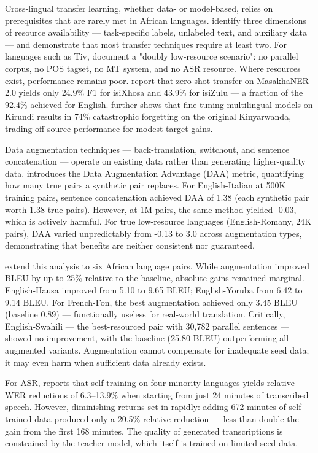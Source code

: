 \documentclass[11pt,a4paper]{article}
\begin{document}
Cross-lingual transfer learning, whether data- or model-based, relies on prerequisites that are rarely met in African languages. \citet{hedderich2021survey} identify three dimensions of resource availability — task-specific labels, unlabeled text, and auxiliary data — and demonstrate that most transfer techniques require at least two. For languages such as Tiv, \citet{achir2026preservation} document a "doubly low-resource scenario": no parallel corpus, no POS tagset, no MT system, and no ASR resource. Where resources exist, performance remains poor. \citet{garcia2025cross} report that zero-shot transfer on MasakhaNER 2.0 yields only 24.9\% F1 for isiXhosa and 43.9\% for isiZulu — a fraction of the 92.4\% achieved for English. \citet{thangaraj2024cross} further shows that fine-tuning multilingual models on Kirundi results in 74\% catastrophic forgetting on the original Kinyarwanda, trading off source performance for modest target gains.

Data augmentation techniques — back-translation, switchout, and sentence concatenation — operate on existing data rather than generating higher-quality data. \citet{lamar2023measuring} introduces the Data Augmentation Advantage (DAA) metric, quantifying how many true pairs a synthetic pair replaces. For English-Italian at 500K training pairs, sentence concatenation achieved DAA of 1.38 (each synthetic pair worth 1.38 true pairs). However, at 1M pairs, the same method yielded -0.03, which is actively harmful. For true low-resource languages (English-Romany, 24K pairs), DAA varied unpredictably from -0.13 to 3.0 across augmentation types, demonstrating that benefits are neither consistent nor guaranteed.

\citet{oduwole2025scarcity} extend this analysis to six African language pairs. While augmentation improved BLEU by up to 25\% relative to the baseline, absolute gains remained marginal. English-Hausa improved from 5.10 to 9.65 BLEU; English-Yoruba from 6.42 to 9.14 BLEU. For French-Fon, the best augmentation achieved only 3.45 BLEU (baseline 0.89) — functionally useless for real-world translation. Critically, English-Swahili — the best-resourced pair with 30,782 parallel sentences — showed no improvement, with the baseline (25.80 BLEU) outperforming all augmented variants. Augmentation cannot compensate for inadequate seed data; it may even harm when sufficient data already exists.

For ASR, \citet{bartelds2023making} reports that self-training on four minority languages yields relative WER reductions of 6.3–13.9\% when starting from just 24 minutes of transcribed speech. However, diminishing returns set in rapidly: adding 672 minutes of self-trained data produced only a 20.5\% relative reduction — less than double the gain from the first 168 minutes. The quality of generated transcriptions is constrained by the teacher model, which itself is trained on limited seed data.
\end{document}
